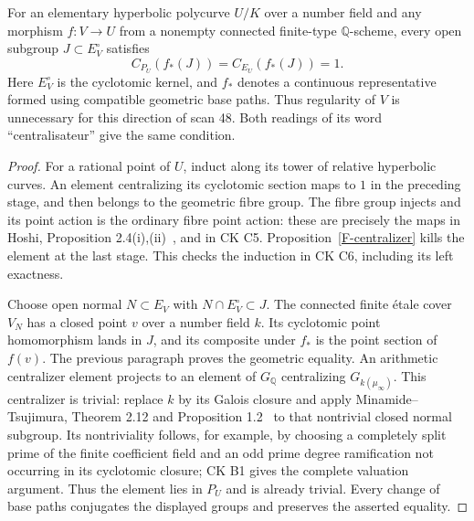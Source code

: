\begin{proposition}
\label{F-geometric-necessary}
For an elementary hyperbolic polycurve $U/K$ over a number field and
any morphism $f:V\to U$ from a nonempty connected finite-type
$\mathbb Q$-scheme, every open subgroup $J\subset E_V^{\circ}$
satisfies
\[
 C_{P_U}(f_*(J))=C_{E_U}(f_*(J))=1.
\]
Here $E_V^{\circ}$ is the cyclotomic kernel, and $f_*$ denotes a
continuous representative formed using compatible geometric base
paths. Thus regularity of $V$ is unnecessary for this direction of
scan 48. Both readings of its word ``centralisateur'' give the same
condition.
\end{proposition}
\begin{proof}
For a rational point of $U$, induct along its tower of relative
hyperbolic curves. An element centralizing its cyclotomic section
maps to $1$ in the preceding stage, and then belongs to the
geometric fibre group. The fibre group injects and its point action
is the ordinary fibre point action: these are precisely the maps
in Hoshi, Proposition 2.4(i),(ii)~\cite{F-HoshiPoly}, and in CK C5.
Proposition~\ref{F-centralizer} kills the element at the last stage.
This checks the induction in CK C6, including its left exactness.

Choose open normal $N\subset E_V$ with $N\cap E_V^{\circ}\subset J$.
The connected finite \'etale cover $V_N$ has a closed point $v$ over
a number field $k$. Its cyclotomic point homomorphism lands in $J$,
and its composite under $f_*$ is the point section of $f(v)$. The
previous paragraph proves the geometric equality. An arithmetic
centralizer element projects to an element of $G_{\mathbb Q}$
centralizing $G_{k(\mu_\infty)}$. This centralizer is trivial:
replace $k$ by its Galois closure and apply Minamide--Tsujimura,
Theorem 2.12 and Proposition 1.2~\cite{F-MinamideTsujimura} to that
nontrivial closed normal subgroup. Its nontriviality follows, for
example, by choosing a completely split prime of the finite
coefficient field and an odd prime degree ramification not occurring
in its cyclotomic closure; CK B1 gives the complete valuation
argument. Thus the element lies in $P_U$ and is already trivial.
Every change of base paths conjugates the displayed groups and
preserves the asserted equality.
\end{proof}

